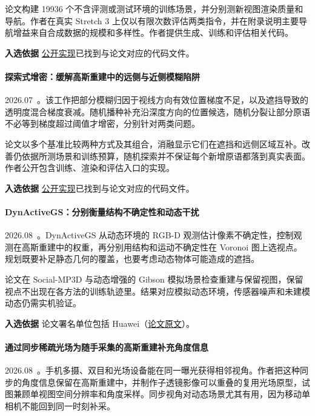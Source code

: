论文构建 19936 个不含评测或测试环境的训练场景，并分别测新视图渲染质量和导航。作者在真实 Stretch 3 上仅以有限次数评估两类指令，并在附录说明主要导航增益来自合成数据的规模和多样性。作者提供生成、训练和评估相关代码。

\textbf{入选依据} \href{https://github.com/mrzihan/image2sim}{公开实现}已找到与论文对应的代码文件。

\paragraph{探索式增密：缓解高斯重建中的远侧与近侧模糊陷阱}
2026.07~\cite{2607_17965}。该工作把部分模糊归因于视线方向有效位置梯度不足，以及遮挡导致的透明度混合梯度衰减。随机播种补充沿深度方向的位置候选，随机分裂让部分原语不必等到梯度超过阈值才增密，分别针对两类问题。

论文以多个基准比较两种方式及其组合，消融显示它们在遮挡和远侧区域互补。改善仍依据所测场景和训练预算，随机探索并不保证每个新增原语都落到真实表面。作者公开包含训练、渲染和评估入口的实现。

\textbf{入选依据} \href{https://github.com/chengbo-wang/exploration-for-gs}{公开实现}已找到与论文对应的代码文件。

\paragraph{DynActiveGS：分别衡量结构不确定性和动态干扰}
2026.08~\cite{2608_01178}。DynActiveGS 从动态环境的 RGB-D 观测估计像素不确定性，控制观测在高斯重建中的权重，再分别用结构和运动不确定性在 Voronoi 图上选视点。规划既要补足静态几何的覆盖，也要考虑动态物体可能造成的遮挡。

论文在 Social-MP3D 与动态增强的 Gibson 模拟场景检查重建与保留视图，保留视点不出现在各方法的训练轨迹里。结果对应模拟动态环境，传感器噪声和未建模动态仍需实机验证。

\textbf{入选依据} 论文署名单位包括 Huawei（\href{https://arxiv.org/abs/2608.01178}{论文原文}）。

\paragraph{通过同步稀疏光场为随手采集的高斯重建补充角度信息}
2026.08~\cite{2608_20602}。手机多摄、双目和光场设备能在同一曝光获得相邻视角。作者把这种同步的角度信息保留在高斯重建中，并制作子透镜影像可以重叠的复用光场原型，试图兼顾单视图空间分辨率和角度采样。同步视角对动态场景尤其有用，因为移动单相机不能回到同一时刻补采。

